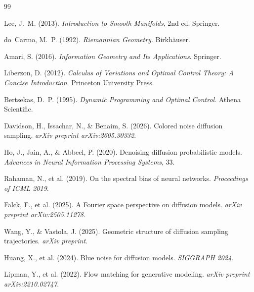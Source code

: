 \documentclass[12pt, a4paper]{article}
\theoremstyle{plain}
\theoremstyle{definition}
\theoremstyle{remark}
\begin{document}
\begin{thebibliography}{99}


Lee, J.~M. (2013).
\newblock \emph{Introduction to Smooth Manifolds}, 2nd ed.
\newblock Springer.

do~Carmo, M.~P. (1992).
\newblock \emph{Riemannian Geometry}.
\newblock Birkh\"{a}user.

Amari, S. (2016).
\newblock \emph{Information Geometry and Its Applications}.
\newblock Springer.

Liberzon, D. (2012).
\newblock \emph{Calculus of Variations and Optimal Control Theory:
  A Concise Introduction}.
\newblock Princeton University Press.

Bertsekas, D.~P. (1995).
\newblock \emph{Dynamic Programming and Optimal Control}.
\newblock Athena Scientific.


Davidson, H., Issachar, N., \& Benaim, S. (2026).
\newblock Colored noise diffusion sampling.
\newblock \emph{arXiv preprint arXiv:2605.30332}.

Ho, J., Jain, A., \& Abbeel, P. (2020).
\newblock Denoising diffusion probabilistic models.
\newblock \emph{Advances in Neural Information Processing Systems}, 33.

Rahaman, N., et al. (2019).
\newblock On the spectral bias of neural networks.
\newblock \emph{Proceedings of ICML 2019}.

Falck, F., et al. (2025).
\newblock A Fourier space perspective on diffusion models.
\newblock \emph{arXiv preprint arXiv:2505.11278}.

Wang, Y., \& Vastola, J. (2025).
\newblock Geometric structure of diffusion sampling trajectories.
\newblock \emph{arXiv preprint}.

Huang, X., et al. (2024).
\newblock Blue noise for diffusion models.
\newblock \emph{SIGGRAPH 2024}.

Lipman, Y., et al. (2022).
\newblock Flow matching for generative modeling.
\newblock \emph{arXiv preprint arXiv:2210.02747}.


\end{thebibliography}
\end{document}
